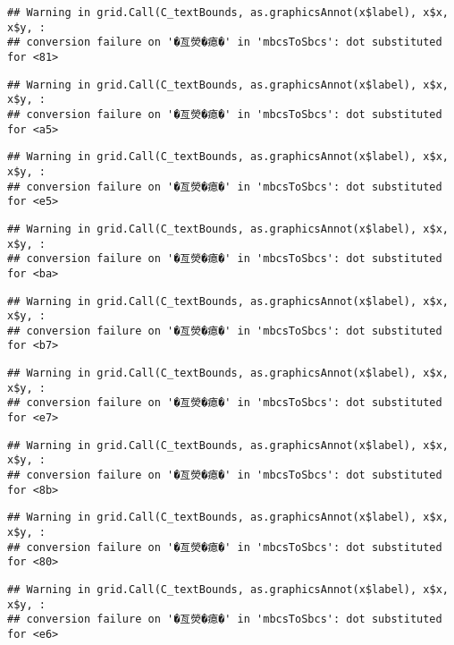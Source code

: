 \documentclass[
]{article}
\begin{document}
\begin{verbatim}
## Warning in grid.Call(C_textBounds, as.graphicsAnnot(x$label), x$x, x$y, :
## conversion failure on '�亙熒�瘜�' in 'mbcsToSbcs': dot substituted for <81>
\end{verbatim}

\begin{verbatim}
## Warning in grid.Call(C_textBounds, as.graphicsAnnot(x$label), x$x, x$y, :
## conversion failure on '�亙熒�瘜�' in 'mbcsToSbcs': dot substituted for <a5>
\end{verbatim}

\begin{verbatim}
## Warning in grid.Call(C_textBounds, as.graphicsAnnot(x$label), x$x, x$y, :
## conversion failure on '�亙熒�瘜�' in 'mbcsToSbcs': dot substituted for <e5>
\end{verbatim}

\begin{verbatim}
## Warning in grid.Call(C_textBounds, as.graphicsAnnot(x$label), x$x, x$y, :
## conversion failure on '�亙熒�瘜�' in 'mbcsToSbcs': dot substituted for <ba>
\end{verbatim}

\begin{verbatim}
## Warning in grid.Call(C_textBounds, as.graphicsAnnot(x$label), x$x, x$y, :
## conversion failure on '�亙熒�瘜�' in 'mbcsToSbcs': dot substituted for <b7>
\end{verbatim}

\begin{verbatim}
## Warning in grid.Call(C_textBounds, as.graphicsAnnot(x$label), x$x, x$y, :
## conversion failure on '�亙熒�瘜�' in 'mbcsToSbcs': dot substituted for <e7>
\end{verbatim}

\begin{verbatim}
## Warning in grid.Call(C_textBounds, as.graphicsAnnot(x$label), x$x, x$y, :
## conversion failure on '�亙熒�瘜�' in 'mbcsToSbcs': dot substituted for <8b>
\end{verbatim}

\begin{verbatim}
## Warning in grid.Call(C_textBounds, as.graphicsAnnot(x$label), x$x, x$y, :
## conversion failure on '�亙熒�瘜�' in 'mbcsToSbcs': dot substituted for <80>
\end{verbatim}

\begin{verbatim}
## Warning in grid.Call(C_textBounds, as.graphicsAnnot(x$label), x$x, x$y, :
## conversion failure on '�亙熒�瘜�' in 'mbcsToSbcs': dot substituted for <e6>
\end{verbatim}
\end{document}
